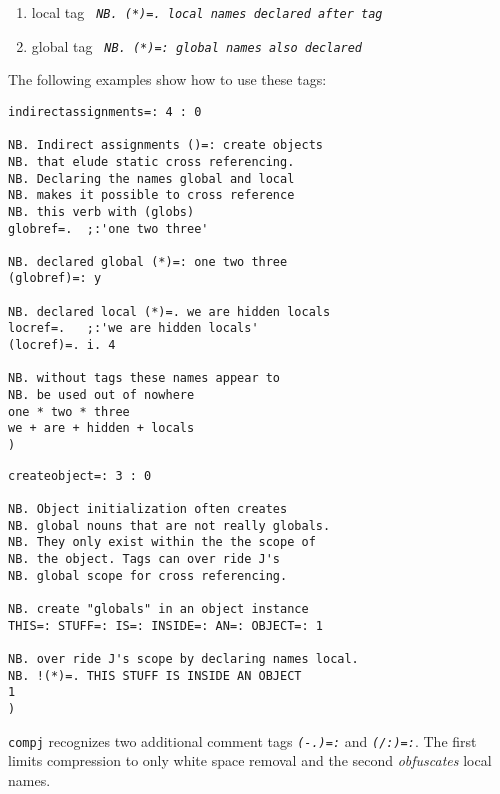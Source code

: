 \begin{enumerate}
	\item local tag \textcolor{CodeComment}{\texttt{\textsl{ NB. (*)=. local names declared after tag}}}
	\item global tag \textcolor{CodeComment}{\texttt{\textsl{ NB. (*)=: global names also declared}}}
\end{enumerate}
  
   The following examples show how to use these tags:

\begin{lstlisting}[frame=single,framerule=0pt]  
indirectassignments=: 4 : 0

NB. Indirect assignments ()=: create objects 
NB. that elude static cross referencing. 
NB. Declaring the names global and local
NB. makes it possible to cross reference 
NB. this verb with (globs)
globref=.  ;:'one two three'

NB. declared global (*)=: one two three
(globref)=: y     

NB. declared local (*)=. we are hidden locals
locref=.   ;:'we are hidden locals'
(locref)=. i. 4  

NB. without tags these names appear to
NB. be used out of nowhere 
one * two * three
we + are + hidden + locals
)
\end{lstlisting}

     
\begin{lstlisting}[frame=single,framerule=0pt]    
createobject=: 3 : 0

NB. Object initialization often creates
NB. global nouns that are not really globals.
NB. They only exist within the the scope of
NB. the object. Tags can over ride J's 
NB. global scope for cross referencing.

NB. create "globals" in an object instance
THIS=: STUFF=: IS=: INSIDE=: AN=: OBJECT=: 1

NB. over ride J's scope by declaring names local.
NB. !(*)=. THIS STUFF IS INSIDE AN OBJECT
1
)
\end{lstlisting}

 \texttt{compj} recognizes two additional comment tags \textcolor{CodeComment}{\texttt{\textsl{(-.)=:}}}
 and \textcolor{CodeComment}{\texttt{\textsl{(/:)=:}}}. The first limits compression to only white space removal
 and the second \emph{obfuscates} local names.
 
